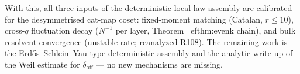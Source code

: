 With this, all three inputs of the deterministic local-law assembly
are calibrated for the desymmetrised cat-map coset: fixed-moment
matching (Catalan, $r \le 10$), cross-$q$ fluctuation decay
($N^{-1}$ per layer, Theorem~
ef{thm:evenk} chain), and bulk
resolvent convergence (unstable rate; reanalyzed R108).  The remaining work is the
Erd\H{o}s--Schlein--Yau-type deterministic assembly and the analytic
write-up of the Weil estimate for $\delta_{\mathrm{off}}$ --- no new
mechanisms are missing.
